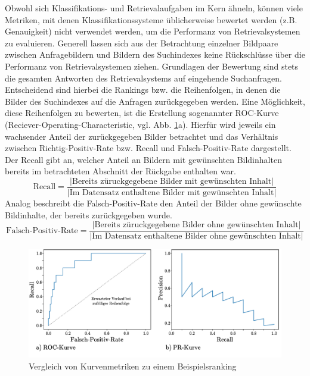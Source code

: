 Obwohl sich Klassifikations- und Retrievalaufgaben im Kern ähneln, können viele Metriken, mit denen Klassifikationssysteme üblicherweise bewertet werden (z.B. Genauigkeit) nicht verwendet werden, um die Performanz von Retrievalsystemen zu evaluieren. Generell lassen sich aus der Betrachtung einzelner Bildpaare zwischen Anfragebildern und Bildern des Suchindexes keine Rückschlüsse über die Performanz von Retrievalsystemen ziehen. Grundlagen der Bewertung sind stets die gesamten Antworten des Retrievalsystems auf eingehende Suchanfragen. Entscheidend sind hierbei die Rankings bzw. die Reihenfolgen, in denen die Bilder des Suchindexes auf die Anfragen zurückgegeben werden. Eine Möglichkeit, diese Reihenfolgen zu bewerten, ist die Erstellung sogenannter ROC-Kurve (Reciever-Operating-Characteristic, vgl. Abb. \ref{metric_curve}a). Hierfür wird jeweils ein wachsender Anteil der zurückgegeben Bilder betrachtet und das Verhältnis zwischen Richtig-Positiv-Rate bzw. Recall und Falsch-Positiv-Rate dargestellt. Der Recall gibt an, welcher Anteil an Bildern mit gewünschten Bildinhalten bereits im betrachteten Abschnitt der Rückgabe enthalten war.
\begin{equation}
\text{Recall} = \frac{|\text{Bereits züruckgegebene Bilder mit gewünschten Inhalt}|}{|\text{Im Datensatz enthaltene Bilder mit gewünschten Inhalt}|}
\end{equation}
Analog beschreibt die Falsch-Positiv-Rate den Anteil der Bilder ohne gewünschte Bildinhalte, der bereits zurückgegeben wurde.
\begin{equation}
\text{Falsch-Positiv-Rate} = \frac{|\text{Bereits züruckgegebene Bilder ohne gewünschten Inhalt}|}{|\text{Im Datensatz enthaltene Bilder ohne gewünschten Inhalt}|}
\end{equation}
\begin{figure}[h]
\includegraphics[scale=0.76]{metric_curves.pdf}
\caption{Vergleich von Kurvenmetriken zu einem Beispielsranking}
\label{metric_curve}
\end{figure}
